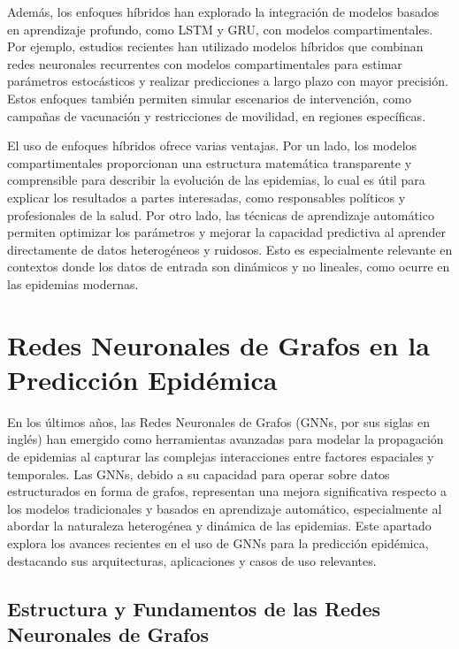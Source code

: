 Además, los enfoques híbridos han explorado la integración de modelos basados en aprendizaje profundo, como LSTM y GRU, con modelos compartimentales. Por ejemplo, estudios recientes han utilizado modelos híbridos que combinan redes neuronales recurrentes con modelos compartimentales para estimar parámetros estocásticos y realizar predicciones a largo plazo con mayor precisión\parencite{Nguyen2023NZSTGNN, Shah2024COVID19FU}. Estos enfoques también permiten simular escenarios de intervención, como campañas de vacunación y restricciones de movilidad, en regiones específicas\parencite{Stergiou2022MachineLearning, Baccega2024Sybil}.

El uso de enfoques híbridos ofrece varias ventajas. Por un lado, los modelos compartimentales proporcionan una estructura matemática transparente y comprensible para describir la evolución de las epidemias, lo cual es útil para explicar los resultados a partes interesadas, como responsables políticos y profesionales de la salud. Por otro lado, las técnicas de aprendizaje automático permiten optimizar los parámetros y mejorar la capacidad predictiva al aprender directamente de datos heterogéneos y ruidosos\parencite{Rodriguez2022DataCentric, Baccega2024Sybil}. Esto es especialmente relevante en contextos donde los datos de entrada son dinámicos y no lineales, como ocurre en las epidemias modernas\parencite{Rizzo2020AutoSEIR, Baccega2024Sybil, Stergiou2022MachineLearning}.

\section{Redes Neuronales de Grafos en la Predicción Epidémica}\label{section:gnns-epidemic-forecasting}

En los últimos años, las Redes Neuronales de Grafos (GNNs, por sus siglas en inglés) han emergido como herramientas avanzadas para modelar la propagación de epidemias al capturar las complejas interacciones entre factores espaciales y temporales. Las GNNs, debido a su capacidad para operar sobre datos estructurados en forma de grafos, representan una mejora significativa respecto a los modelos tradicionales y basados en aprendizaje automático, especialmente al abordar la naturaleza heterogénea y dinámica de las epidemias. Este apartado explora los avances recientes en el uso de GNNs para la predicción epidémica, destacando sus arquitecturas, aplicaciones y casos de uso relevantes.

\subsection{Estructura y Fundamentos de las Redes Neuronales de Grafos}

